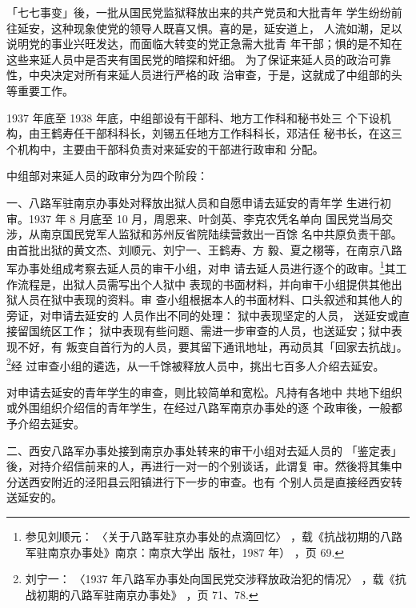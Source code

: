 「七七事变」後，一批从国民党监狱释放出来的共产党员和大批青年
学生纷纷前往延安，这种现象使党的领导人既喜又惧。喜的是，延安道上，
人流如潮，足以说明党的事业兴旺发达，而面临大转变的党正急需大批青
年干部；惧的是不知在这些来延人员中是否夹有国民党的暗探和奸细。
为了保证来延人员的政治可靠性，中央决定对所有来延人员进行严格的政
治审查，于是，这就成了中组部的头等重要工作。

1937 年底至 1938 年底，中组部设有干部科、地方工作科和秘书处三
个下设机构，由王鹤寿任干部科科长，刘锡五任地方工作科科长，邓洁任
秘书长，在这三个机构中，主要由干部科负责对来延安的干部进行政审和
分配。

中组部对来延人员的政审分为四个阶段：

一、八路军驻南京办事处对释放出狱人员和自愿申请去延安的青年学
生进行初审。1937 年 8 月底至 10 月，周恩来、叶剑英、李克农凭名单向
国民党当局交涉，从南京国民党军人监狱和苏州反省院陆续营救出一百馀
名中共原负责干部。由首批出狱的黄文杰、刘顺元、刘宁一、王鹤寿、方
毅、夏之栩等，在南京八路军办事处组成考察去延人员的审干小组，对申
请去延人员进行逐个的政审。\footnote{参见刘顺元：
〈关于八路军驻京办事处的点滴回忆〉
，载《抗战初期的八路军驻南京办事处》南京：南京大学出
版社，1987 年）
，页 69. }其工作流程是，出狱人员需写出个人狱中
表现的书面材料，并向审干小组提供其他出狱人员在狱中表现的资料。审
查小组根据本人的书面材料、口头叙述和其他人的旁证，对申请去延安的
人员作出不同的处理：
狱中表现坚定的人员，
送延安或直接留国统区工作；
狱中表现有些问题、需进一步审查的人员，也送延安；狱中表现不好，有
叛变自首行为的人员，要其留下通讯地址，再动员其「回家去抗战」。
\footnote{刘宁一：
〈1937 年八路军办事处向国民党交涉释放政治犯的情况〉
，载《抗战初期的八路军驻南京办事处》
，页
71、78. }经
过审查小组的遴选，从一千馀被释放人员中，挑出七百多人介绍去延安。

对申请去延安的青年学生的审查，则比较简单和宽松。凡持有各地中
共地下组织或外围组织介绍信的青年学生，在经过八路军南京办事处的逐
个政审後，一般都予介绍去延安。

二、西安八路军办事处接到南京办事处转来的审干小组对去延人员的
「鉴定表」後，对持介绍信前来的人，再进行一对一的个别谈话，此谓复
审。然後将其集中分送西安附近的泾阳县云阳镇进行下一步的审查。也有
个别人员是直接经西安转送延安的。


